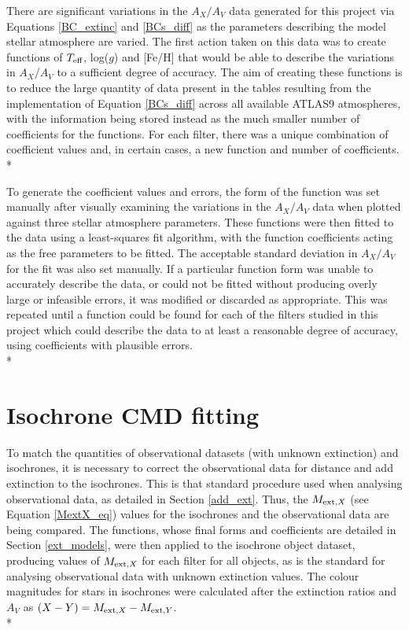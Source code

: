 \documentclass[12pt, a4paper]{report}
\begin{document}
There are significant variations in the $A_{X}/A_{V}$ data generated for this project via Equations \ref{BC_extinc} and \ref{BCs_diff} as the parameters describing the model stellar atmosphere are varied. The first action taken on this data was to create functions of $T_{\textnormal{eff}}$, log($g$) and [Fe/H] that would be able to describe the variations in $A_{X}/A_{V}$ to a sufficient degree of accuracy. The aim of creating these functions is to reduce the large quantity of data present in the tables resulting from the implementation of Equation \ref{BCs_diff} across all available ATLAS9 atmospheres, with the information being stored instead as the much smaller number of coefficients for the functions. For each filter, there was a unique combination of coefficient values and, in certain cases, a new function and number of coefficients.\\*

To generate the coefficient values and errors, the form of the function was set manually after visually examining the variations in the $A_{X}/A_{V}$ data when plotted against three stellar atmosphere parameters. These functions were then fitted to the data using a least-squares fit algorithm, with the function coefficients acting as the free parameters to be fitted. The acceptable standard deviation in $A_{X}/A_{V}$ for the fit was also set manually. If a particular function form was unable to accurately describe the data, or could not be fitted without producing overly large or infeasible errors, it was modified or discarded as appropriate. This was repeated until a function could be found for each of the filters studied in this project which could  describe the data to at least a reasonable degree of accuracy, using coefficients with plausible errors.\\*

\section{Isochrone CMD fitting} \label{isoc_fit} 

To match the quantities of observational datasets (with unknown extinction) and isochrones, it is necessary to correct the observational data for distance and add extinction to the isochrones. This is that standard procedure used when analysing observational data, as detailed in Section \ref{add_ext}. Thus, the $M_{\textnormal{ext},X}$ (see Equation \ref{MextX_eq}) values for the isochrones and the observational data are being compared. The functions, whose final forms and coefficients are detailed in Section \ref{ext_models}, were then applied to the isochrone object dataset, producing values of $M_{\textnormal{ext},X}$ for each filter for all objects, as is the standard for analysing observational data with unknown extinction values. The colour magnitudes for stars in isochrones were calculated after the extinction ratios and $A_{V}$ as $(X-Y) = M_{\textnormal{ext},X} - M_{\textnormal{ext},Y}$.\\*
\end{document}
